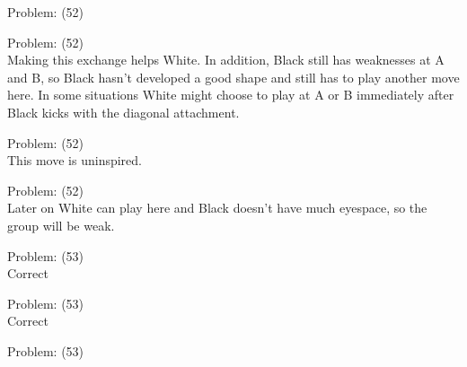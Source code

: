 \documentclass[11pt]{article}
\begin{document}
\begin{minipage}[t]{0.5\textwidth}
  {\centering
  
  Problem: (52)\\
  
  }
\end{minipage}
\begin{minipage}[t]{0.5\textwidth}
  {\centering
  
  Problem: (52)\\
  Making this exchange helps White. In addition, Black still has weaknesses at A and B, so Black hasn't developed a good shape and still has to play another move here. In some situations White might choose to play at A or B immediately after Black kicks with the diagonal attachment.\\
  }
\end{minipage}
\begin{minipage}[t]{0.5\textwidth}
  {\centering
  
  Problem: (52)\\
  This move is uninspired.\\
  }
\end{minipage}
\begin{minipage}[t]{0.5\textwidth}
  {\centering
  
  Problem: (52)\\
  Later on White can play here and Black doesn't have much eyespace, so the group will be weak.\\
  }
\end{minipage}
\begin{minipage}[t]{0.5\textwidth}
  {\centering
  
  Problem: (53)\\
  Correct\\
  }
\end{minipage}
\begin{minipage}[t]{0.5\textwidth}
  {\centering
  
  Problem: (53)\\
  Correct\\
  }
\end{minipage}
\begin{minipage}[t]{0.5\textwidth}
  {\centering
  
  Problem: (53)\\
  
  }
\end{minipage}
\end{document}
